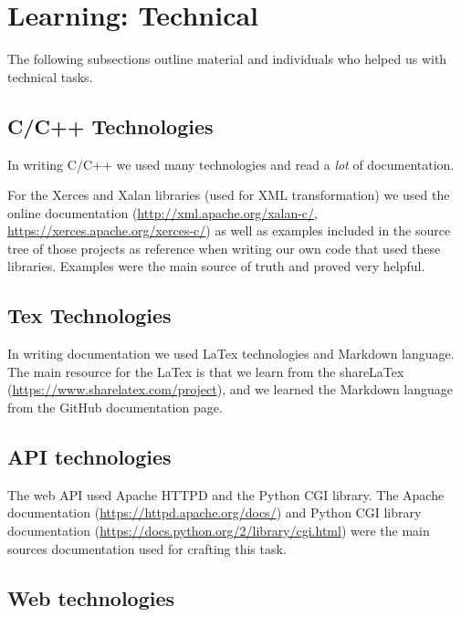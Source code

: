 \section{Learning: Technical}

The following subsections outline material and individuals who helped us with technical tasks.

\subsection{C/C++ Technologies}

In writing C/C++ we used many technologies and read a \textit{lot} of documentation.

For the Xerces and Xalan libraries (used for XML transformation) we used the online documentation (\url{http://xml.apache.org/xalan-c/}, \url{https://xerces.apache.org/xerces-c/}) as well as examples included in the source tree of those projects as reference when writing our own code that used these libraries.
Examples were the main source of truth and proved very helpful.

\subsection{Tex Technologies}

In writing documentation we used LaTex technologies and Markdown language.
The main resource for the LaTex is that we learn from the shareLaTex (\url{https://www.sharelatex.com/project}), and we learned the Markdown language from the GitHub documentation page.

\subsection{API technologies}

The web API used Apache HTTPD and the Python CGI library.
The Apache documentation (\url{https://httpd.apache.org/docs/}) and Python CGI library documentation (\url{https://docs.python.org/2/library/cgi.html}) were the main sources documentation used for crafting this task.

\subsection{Web technologies}

